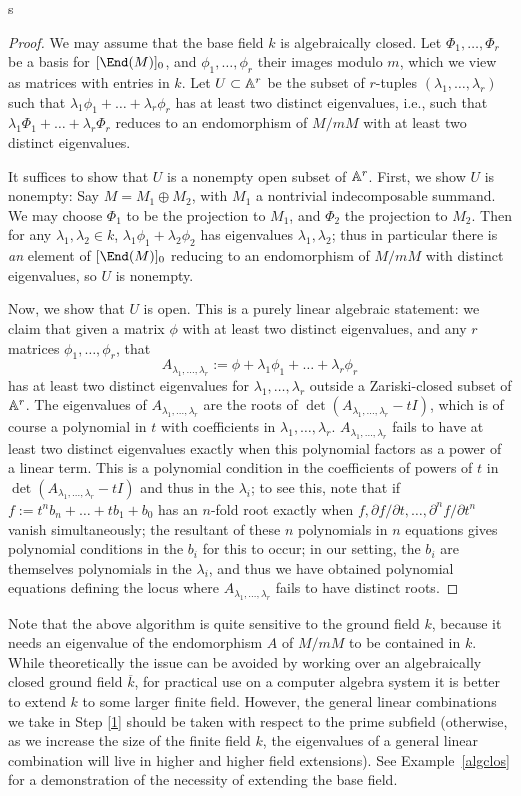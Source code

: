s\documentclass{article}
\let\l\lambda
\let\bar\overline
\numberwithin{equation}{section}
\let\d\partial
\theoremstyle{theorem}
\numberwithin{thm}{section}
\theoremstyle{definition}
\begin{document}
\begin{proof}
  We may assume that the base field $k$ is algebraically closed.
  Let $\Phi_1,\dots,\Phi_r$ be a basis for $[\End(M)]_0$, and $\phi_1,\dots,\phi_r$ their images modulo $m$, which we view as matrices with entries in $k$.
  Let $U\subset \mathbb A^r$ be the subset of $r$-tuples $(\l_1,\dots,\l_r)$ such that $\l_1\phi_1+\dots+\l_r\phi_r$ has at least two distinct eigenvalues, i.e., such that $\l_1\Phi_1+\dots+\l_r\Phi_r$ reduces to an endomorphism of $M/mM$ with at least two distinct eigenvalues.

  It suffices to show that $U$ is a nonempty open subset of $\mathbb A^r$. First, we show $U$ is nonempty:
  Say $M=M_1\oplus M_2$, with $M_1$ a nontrivial indecomposable summand. We may choose $\Phi_1$ to be the projection to $M_1$, and $\Phi_2$ the projection to $M_2$. Then for any $\l_1,\l_2\in k$, $\l_1\phi_1 + \l_2\phi_2$ has eigenvalues $\l_1,\l_2$; thus in particular there is \emph{an} element of $[\End(M)]_0$ reducing to an endomorphism of $M/mM$ with distinct eigenvalues, so $U$ is nonempty.

  Now, we show that $U$ is open. This is a purely linear algebraic statement: we claim that given a matrix $\phi$ with at least two distinct eigenvalues, and any $r$ matrices $\phi_1,\dots,\phi_r$, that
  $$ A_{\l_1,\dots,\l_r}:=\phi+\l_1\phi_1+\dots+\l_r\phi_r $$
  has at least two distinct eigenvalues for $\l_1,\dots,\l_r$ outside a Zariski-closed subset of $\mathbb A^r$.
  The eigenvalues of $A_{\l_1,\dots,\l_r}$ are the roots of $\det(A_{\l_1,\dots,\l_r}-t I)$, which is of course a polynomial in $t$ with coefficients in $\l_1,\dots,\l_r$. $A_{\l_1,\dots,\l_r}$ fails to have at least two distinct eigenvalues exactly when this polynomial factors as a power of a linear term. This is a polynomial condition in the coefficients of powers of $t$ in $\det(A_{\l_1,\dots,\l_r}-t I)$ and thus in the $\l_i$; to see this, note that if
  $ f:=t^n b_n +\dots +t b_1 +b_0 $
  has an $n$-fold root exactly when
  $ f,\d f/\d t,\dots, \d^n f/\d t^n $
  vanish simultaneously; the resultant of these $n$ polynomials in $n$ equations gives polynomial conditions in the $b_i$ for this to occur; in our setting, the $b_i$ are themselves polynomials in the $\l_i$, and thus we have obtained polynomial equations defining the locus where $A_{\l_1,\dots,\l_r}$ fails to have distinct roots.
\end{proof}


\begin{rem}
  Note that the above algorithm is quite sensitive to the ground field $k$, because it needs an eigenvalue of the endomorphism $A$ of $M/mM$ to be contained in $k$. While theoretically the issue can be avoided by working over an algebraically closed ground field $\bar k$, for practical use on a computer algebra system it is better to extend $k$ to some larger finite field. However, the general linear combinations we take in Step \ref{1} should be taken with respect to the prime subfield (otherwise, as we increase the size of the finite field $k$, the eigenvalues of a general linear combination will live in higher and higher field extensions).
See Example~\ref{algclos} for a demonstration of the necessity of extending the base field.
\end{rem}
\end{document}
